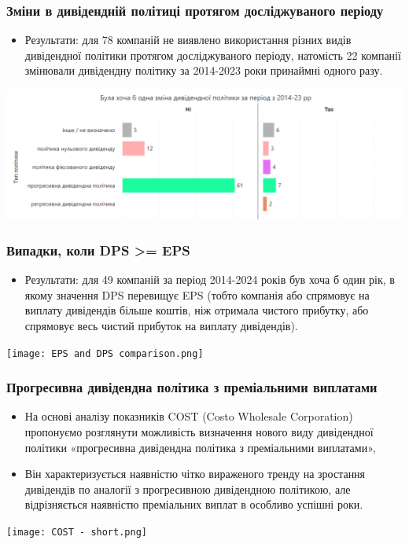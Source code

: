 \documentclass[aspectratio=169]{beamer}
\begin{document}
\begin{frame}
\frametitle{Зміни в дивідендній політиці протягом досліджуваного періоду}
\begin{center}
\begin{itemize}
\item  \alert {Результати:} для 78 компаній не виявлено використання різних видів дивідендної політики протягом досліджуваного періоду, натомість 22 компанії змінювали дивідендну політику за 2014-2023 роки принаймні одного разу.
\end{itemize} 
\bigskip
\includegraphics[scale=0.35]{Dividend policy Changes.png}
\end{center}
\end{frame}

\begin{frame}
\frametitle{Випадки, коли DPS >= EPS }
\begin{center}
\begin{itemize}
\item  \alert {Результати:} для 49 компаній за період 2014-2024 років був хоча б один рік, в якому значення DPS перевищує EPS (тобто компанія або спрямовує на виплату дивідендів більше коштів, ніж отримала чистого прибутку, або спрямовує весь чистий прибуток на виплату дивідендів).
\end{itemize}
\bigskip
\texttt{[image: EPS and DPS comparison.png]}
\end{center}
\end{frame}

\begin{frame}
\frametitle{Прогресивна дивідендна політика з преміальними виплатами}
\begin{multicols}{2}
\begin{itemize}
\item На основі аналізу показників COST (Costo Wholesale Corporation) пропонуємо розглянути можливість визначення нового виду дивідендної політики \alert {«прогресивна дивідендна політика з преміальними виплатами»},
\bigskip
\item Він характеризується наявністю чітко вираженого тренду на зростання дивідендів по аналогії з прогресивною дивідендною політикою, але відрізняється наявністю преміальних виплат в особливо успішні роки.
\end{itemize}
\columnbreak
\hspace{5mm}
\texttt{[image: COST - short.png]}
\end{multicols}
\end{frame}
\end{document}
